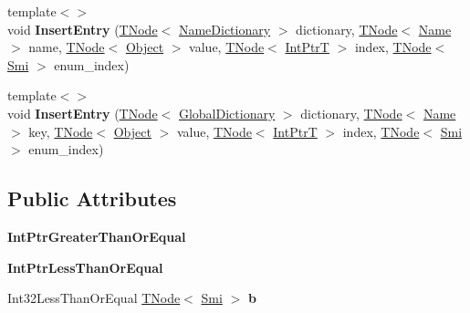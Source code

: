 \begin{DoxyCompactItemize}
{\footnotesize template$<$$>$ }\\void {\bfseries Insert\+Entry} (\mbox{\hyperlink{classv8_1_1internal_1_1compiler_1_1TNode}{T\+Node}}$<$ \mbox{\hyperlink{classv8_1_1internal_1_1NameDictionary}{Name\+Dictionary}} $>$ dictionary, \mbox{\hyperlink{classv8_1_1internal_1_1compiler_1_1TNode}{T\+Node}}$<$ \mbox{\hyperlink{classv8_1_1internal_1_1Name}{Name}} $>$ name, \mbox{\hyperlink{classv8_1_1internal_1_1compiler_1_1TNode}{T\+Node}}$<$ \mbox{\hyperlink{classv8_1_1internal_1_1Object}{Object}} $>$ value, \mbox{\hyperlink{classv8_1_1internal_1_1compiler_1_1TNode}{T\+Node}}$<$ \mbox{\hyperlink{structv8_1_1internal_1_1IntPtrT}{Int\+PtrT}} $>$ index, \mbox{\hyperlink{classv8_1_1internal_1_1compiler_1_1TNode}{T\+Node}}$<$ \mbox{\hyperlink{classv8_1_1internal_1_1Smi}{Smi}} $>$ enum\+\_\+index)
\item 
\mbox{\label{classv8_1_1internal_1_1CodeStubAssembler_a5ecc76157d64c082e8972361bd8194a4}} 
{\footnotesize template$<$$>$ }\\void {\bfseries Insert\+Entry} (\mbox{\hyperlink{classv8_1_1internal_1_1compiler_1_1TNode}{T\+Node}}$<$ \mbox{\hyperlink{classv8_1_1internal_1_1GlobalDictionary}{Global\+Dictionary}} $>$ dictionary, \mbox{\hyperlink{classv8_1_1internal_1_1compiler_1_1TNode}{T\+Node}}$<$ \mbox{\hyperlink{classv8_1_1internal_1_1Name}{Name}} $>$ key, \mbox{\hyperlink{classv8_1_1internal_1_1compiler_1_1TNode}{T\+Node}}$<$ \mbox{\hyperlink{classv8_1_1internal_1_1Object}{Object}} $>$ value, \mbox{\hyperlink{classv8_1_1internal_1_1compiler_1_1TNode}{T\+Node}}$<$ \mbox{\hyperlink{structv8_1_1internal_1_1IntPtrT}{Int\+PtrT}} $>$ index, \mbox{\hyperlink{classv8_1_1internal_1_1compiler_1_1TNode}{T\+Node}}$<$ \mbox{\hyperlink{classv8_1_1internal_1_1Smi}{Smi}} $>$ enum\+\_\+index)
\end{DoxyCompactItemize}
\subsection*{Public Attributes}
\begin{DoxyCompactItemize}
\item 
\mbox{\label{classv8_1_1internal_1_1CodeStubAssembler_a757261d4408480c06bb97879ecaab64e}} 
{\bfseries Int\+Ptr\+Greater\+Than\+Or\+Equal}
\item 
\mbox{\label{classv8_1_1internal_1_1CodeStubAssembler_afc610c3ceeaa94191b751b42954ce54a}} 
{\bfseries Int\+Ptr\+Less\+Than\+Or\+Equal}
\item 
\mbox{\label{classv8_1_1internal_1_1CodeStubAssembler_a8724ec3504927a4b2bdb526d25db45e8}} 
Int32\+Less\+Than\+Or\+Equal \mbox{\hyperlink{classv8_1_1internal_1_1compiler_1_1TNode}{T\+Node}}$<$ \mbox{\hyperlink{classv8_1_1internal_1_1Smi}{Smi}} $>$ {\bfseries b}
\end{DoxyCompactItemize}

